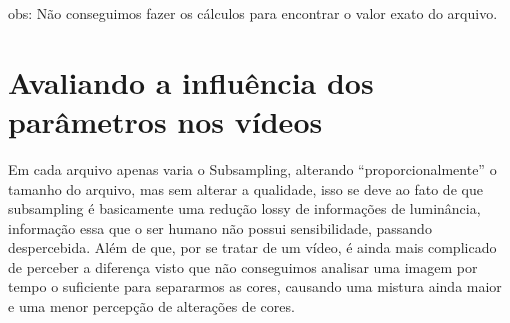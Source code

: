 obs: Não conseguimos fazer os cálculos para encontrar o valor exato do arquivo.


\section{Avaliando a influência dos parâmetros nos vídeos}
Em cada arquivo apenas varia o Subsampling, alterando “proporcionalmente” o tamanho do arquivo, mas sem alterar a qualidade, isso se deve ao fato de que subsampling é basicamente uma redução lossy de informações de luminância, informação essa que o ser humano não possui sensibilidade, passando despercebida. Além de que, por se tratar de um vídeo, é ainda mais complicado de perceber a diferença visto que não conseguimos analisar uma imagem por tempo o suficiente para separarmos as cores, causando uma mistura ainda maior e uma menor percepção de alterações de cores.